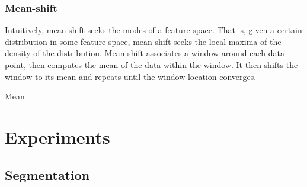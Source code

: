\documentclass[12pt]{article}
\begin{document}
\subsubsection{Mean-shift}

Intuitively, mean-shift seeks the modes of a feature space. That is, given a certain distribution in some feature space, mean-shift seeks the local maxima of the density of the distribution. Mean-shift associates a window around each data point, then computes the mean of the data within the window. It then shifts the window to its mean and repeats until the window location converges.

Mean

\section{Experiments}

\subsection{Segmentation}
\end{document}
